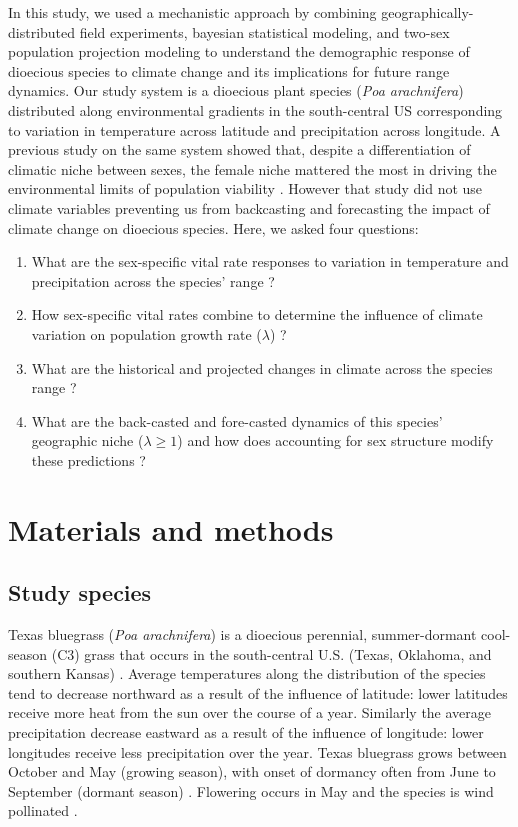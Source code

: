 \documentclass[12pt]{article}
\begin{document}
In this study, we used a mechanistic approach by combining geographically-distributed field experiments, bayesian statistical modeling, and two-sex population projection modeling to understand the demographic response of dioecious species to climate change and its implications for future range dynamics.
Our study system is a dioecious plant species (\textit{Poa arachnifera}) distributed along environmental gradients in the south-central US corresponding to variation in temperature across latitude and precipitation across longitude. 
A previous study on the same system showed that, despite a differentiation of climatic niche between sexes, the female niche mattered the most in driving the environmental limits of population viability \citep{miller2022two}.
However that study did not use climate variables preventing us from backcasting and forecasting the impact of climate change on dioecious species.
Here, we asked four questions: 
\begin{enumerate}
	\item What are the sex-specific vital rate responses to variation in temperature and precipitation across the species' range ?
	\item How sex-specific vital rates combine to determine the influence of climate variation on population growth rate ($\lambda$) ?
	\item What are the historical and projected changes in climate across the species range ?
	\item What are the back-casted and fore-casted dynamics of this species' geographic niche ($\lambda \geq 1$) and how does accounting for sex structure modify these predictions ?
\end{enumerate}

\section*{Materials and methods}
\subsection*{Study species}
Texas bluegrass (\textit{Poa arachnifera}) is a dioecious perennial, summer-dormant cool-season (C3) grass that occurs in the south-central U.S. (Texas, Oklahoma, and southern Kansas) \citep{hitchcock1971manual}. 
Average temperatures along the distribution of the species tend to decrease northward as a result of the influence of latitude: lower latitudes receive more heat from the sun over the course of a year.
Similarly the average precipitation decrease eastward as a result of the influence of longitude: lower longitudes receive less precipitation over the year.
Texas bluegrass grows between October and May (growing season), with onset of dormancy often from June to September (dormant season) \citep{kindiger2004interspecific}.
Flowering occurs in May and the species is wind pollinated \citep{hitchcock1971manual}.
\end{document}
